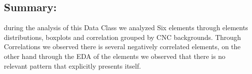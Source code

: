 \documentclass[12pt]{extreport}
\begin{document}
\begin{comment}

\subparagraph{Interpretation of the Box-plots:}

The numbers Below and the box-plots above show that in this element  PSI and TSI students performance is roughly equivalent
and that their performance is almost better than half of the MP students.
\begin{enumerate}
	\item The MP Class Box-Plot:
	\begin{enumerate}
		\item MAX = 19.75 {} {} {} {} {} {} {} {} UQ = 19.5 {} {} {} {} {} {} {} {} Median = 18.5
		\item LQ = 15.5 {} {} {} {} {} {} {} {} MIN = 12.25 IQR = 19.5 - 15.5 = 4
	\end{enumerate}
	\item The PSI Class Box-Plot:
	\begin{enumerate}
		\item MAX = 19.5 {} {} {} {} {} {} {} {} UQ = 17.75 {} {} {} {} {} {} {} {} Median = 16.75
		\item LQ = 16.5 {} {} {} {} {} {} {} {} MIN = 15 {} {} {} {} {} {} {} {} IQR = 17.75 - 16.5 = 1.25	
	\end{enumerate}
	\item The TSI Class Box-Plot:
	\begin{enumerate}
		\item MAX = 18.5 {} {} {} {} {} {} {} {} UQ = 18.25 {} {} {} {} {} {} {} {} Median = 15.5	
		\item LQ = 12.75 {} {} {} {} {} {} {} {} MIN = 12.25 {} {} {} {} {} {} {} {} IQR = 18.25 - 12.75 = 5.5	
	\end{enumerate}
\end{enumerate}

\subparagraph{Interpretation of the histogram:}
This Frequency Distribution is (Skeness) with the following descriptive statistics:


\begin{enumerate}
	\item Mean = a
	\item STD = 3.76
	\item Range = 20 - 10 = 10
	\item IQR = 20 - 12.12 = 7.88
\end{enumerate}
\end{comment}



\subsection{Summary:}
during the analysis of this Data Class we analyzed Six elements through elements distributions, boxplots and correlation grouped by CNC backgrounds. Through Correlations we observed there is several negatively correlated elements, on the other hand through the EDA of the elements we observed that there is no relevant pattern that explicitly presents itself.
\end{document}
